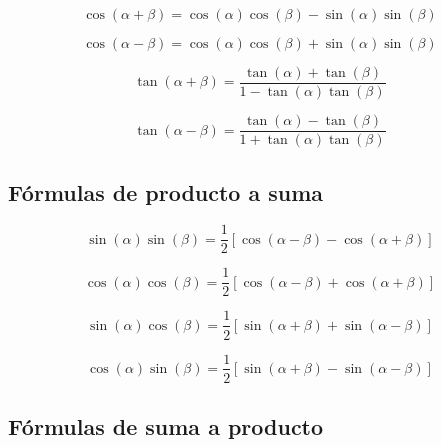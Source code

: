 \begin{proposición}
$$\cos(\alpha + \beta) = \cos(\alpha)\cos(\beta) - \sin(\alpha)\sin(\beta)$$
\end{proposición}

\begin{proposición}
$$\cos(\alpha - \beta) = \cos(\alpha)\cos(\beta) + \sin(\alpha)\sin(\beta)$$
\end{proposición}

\begin{proposición}
$$\tan(\alpha + \beta) = \frac{\tan(\alpha) + \tan(\beta)}{1 - \tan(\alpha)\tan(\beta)}$$
\end{proposición}

\begin{proposición}
$$\tan(\alpha - \beta) = \frac{\tan(\alpha) - \tan(\beta)}{1 + \tan(\alpha)\tan(\beta)}$$
\end{proposición}

\subsection{Fórmulas de producto a suma}

\begin{proposición}
$$\sin(\alpha)\sin(\beta) = \frac{1}{2}\left[\cos(\alpha - \beta) - \cos(\alpha + \beta)\right]$$
\end{proposición}

\begin{proposición}
$$\cos(\alpha)\cos(\beta) = \frac{1}{2}\left[\cos(\alpha - \beta) + \cos(\alpha + \beta)\right]$$
\end{proposición}

\begin{proposición}
$$\sin(\alpha)\cos(\beta) = \frac{1}{2}\left[\sin(\alpha + \beta) + \sin(\alpha - \beta)\right]$$
\end{proposición}

\begin{proposición}
$$\cos(\alpha)\sin(\beta) = \frac{1}{2}\left[\sin(\alpha + \beta) - \sin(\alpha - \beta)\right]$$
\end{proposición}

\subsection{Fórmulas de suma a producto}

